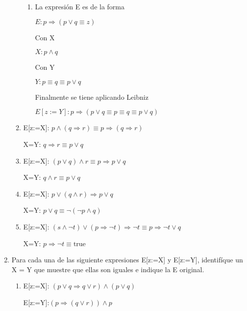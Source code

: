 \documentclass{article}
\begin{document}
\begin{enumerate}
\begin{enumerate}
\begin{enumerate}
				\item \textlangle{} La expresión E es de la forma \textrangle\par
				$E: p \Rightarrow (p \lor q \equiv z)$\par
				\textlangle{} Con X \textrangle\par
				$X: p \land q$\par
				\textlangle{} Con Y \textrangle\par
				$Y: p \equiv q \equiv p \lor q$\par
				\textlangle{} Finalmente se tiene aplicando Leibniz \textrangle\par
				$E[z:=Y]: p \Rightarrow (p \lor q \equiv p \equiv q \equiv p \lor q)$\par
				\hspace{0.8cm}
			\end{enumerate}

		\item E[z:=X]: $p \land (q \Rightarrow r) \equiv p \Rightarrow (q \Rightarrow r)$ \par
		 X=Y: $q \Rightarrow r \equiv p \lor q$

		\item E[z:=X]: $(p \lor q) \land r \equiv p \Rightarrow p \lor q$ \par
		 X=Y: $q \land r \equiv p \lor q$

		\item E[z:=X]: $p \lor (q \land r) \Rightarrow p \lor q$ \par
		 X=Y: $p \lor q \equiv \neg (\neg p \land q)$

		\item E[z:=X]: $(s \land \neg t) \lor (p \Rightarrow \neg t) \Rightarrow \neg t \equiv p \Rightarrow \neg t \lor q$ \par
		 X=Y: $p \Rightarrow \neg t \equiv \text{true}$

	\end{enumerate}

	\item Para cada una de las siguiente expresiones E[z:=X] y E[z:=Y], identifíque un  X = Y
	que muestre que ellas son iguales e indique la E original.

	\begin{enumerate}
		\item  E[z:=X]: $(p \lor q \Rightarrow q \lor r) \land (p \lor q)$ \par
		 E[z:=Y]:$(p \Rightarrow (q \lor r)) \land p$ \par


\end{enumerate}
\end{enumerate}
\end{document}
